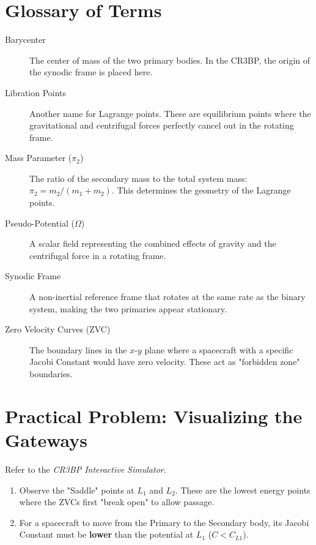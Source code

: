 \documentclass[11pt, letter]{article}
\begin{document}
\section{Glossary of Terms}
\begin{description}
\item[Barycenter] The center of mass of the two primary bodies. In the CR3BP, the origin of the synodic frame is placed here.
\item[Libration Points] Another name for Lagrange points. These are equilibrium points where the gravitational and centrifugal forces perfectly cancel out in the rotating frame.
\item[Mass Parameter ($\pi_2$)] The ratio of the secondary mass to the total system mass: $\pi_2 = m_2 / (m_1 + m_2)$. This determines the geometry of the Lagrange points.
\item[Pseudo-Potential ($\Omega$)] A scalar field representing the combined effects of gravity and the centrifugal force in a rotating frame.
\item[Synodic Frame] A non-inertial reference frame that rotates at the same rate as the binary system, making the two primaries appear stationary.
\item[Zero Velocity Curves (ZVC)] The boundary lines in the $x$-$y$ plane where a spacecraft with a specific Jacobi Constant would have zero velocity. These act as "forbidden zone" boundaries.
\end{description}

\section{Practical Problem: Visualizing the Gateways}
Refer to the \textit{CR3BP Interactive Simulator}. 
\begin{enumerate}
\item Observe the "Saddle" points at $L_1$ and $L_2$. These are the lowest energy points where the ZVCs first "break open" to allow passage.
\item For a spacecraft to move from the Primary to the Secondary body, its Jacobi Constant must be \textbf{lower} than the potential at $L_1$ ($C < C_{L1}$). 
\end{enumerate}
\end{document}
